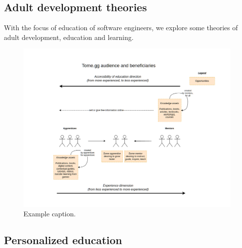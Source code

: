 \documentclass[journal, onecolumn]{IEEEtran}
\newcommand{\tomegg}{
  \href{http://tome.gg}{Tome.gg}
}
\begin{document}
\subsection{Adult development theories}

With the focus of education of software engineers, we explore some theories of 
adult development, education and learning.




\begin{figure}[t]
  \centering
  \includegraphics[width=\textwidth]{00-tomegg-actors.png}
  \caption{Example caption.}
  \label{fig:example}
\end{figure}

\subsection{Personalized education}
\end{document}
